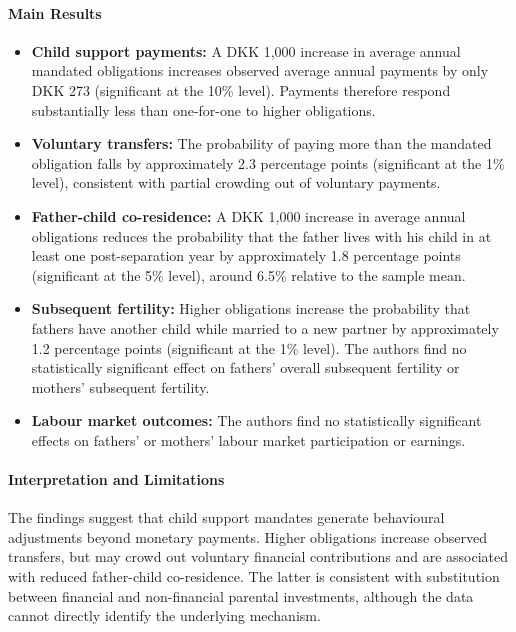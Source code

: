 \documentclass{article}
\begin{document}
\paragraph{Main Results}
\begin{itemize}
    \item \textbf{Child support payments:} A DKK 1,000 increase in average annual mandated obligations increases observed average annual payments by only DKK 273 (significant at the 10\% level). Payments therefore respond substantially less than one-for-one to higher obligations.

    \item \textbf{Voluntary transfers:} The probability of paying more than the mandated obligation falls by approximately 2.3 percentage points (significant at the 1\% level), consistent with partial crowding out of voluntary payments.

    \item \textbf{Father-child co-residence:} A DKK 1,000 increase in average annual obligations reduces the probability that the father lives with his child in at least one post-separation year by approximately 1.8 percentage points (significant at the 5\% level), around 6.5\% relative to the sample mean.

    \item \textbf{Subsequent fertility:} Higher obligations increase the probability that fathers have another child while married to a new partner by approximately 1.2 percentage points (significant at the 1\% level). The authors find no statistically significant effect on fathers' overall subsequent fertility or mothers' subsequent fertility.

    \item \textbf{Labour market outcomes:} The authors find no statistically significant effects on fathers' or mothers' labour market participation or earnings.
\end{itemize}

\paragraph{Interpretation and Limitations}
The findings suggest that child support mandates generate behavioural adjustments beyond monetary payments. Higher obligations increase observed transfers, but may crowd out voluntary financial contributions and are associated with reduced father-child co-residence. The latter is consistent with substitution between financial and non-financial parental investments, although the data cannot directly identify the underlying mechanism.
\end{document}
